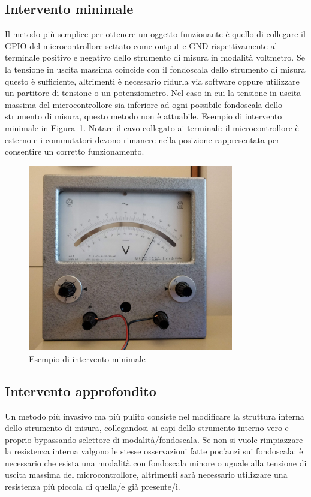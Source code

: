 \documentclass[12pt,a4paper]{report}
\begin{document}
\subsection{Intervento minimale}
Il metodo più semplice per ottenere un oggetto funzionante è quello di collegare il GPIO del microcontrollore settato come output
e GND rispettivamente al terminale positivo e negativo dello strumento di misura in modalità voltmetro. Se la tensione in uscita massima
coincide con il fondoscala dello strumento di misura questo è sufficiente, altrimenti è necessario ridurla via software oppure
utilizzare un partitore di tensione o un potenziometro. Nel caso in cui la tensione in uscita massima del microcontrollore sia inferiore
ad ogni possibile fondoscala dello strumento di misura, questo metodo non è attuabile. Esempio di intervento minimale in
Figura~\ref{fig:interventominimale}. Notare il cavo collegato ai terminali: il microcontrollore è esterno
e i commutatori devono rimanere nella posizione rappresentata per consentire un corretto funzionamento.

\begin{figure}[h]
  \centering
  \includegraphics[width=0.8\textwidth]{interventominimale}
  \caption{Esempio di intervento minimale}
  \label{fig:interventominimale}
\end{figure}

\subsection{Intervento approfondito}
Un metodo più invasivo ma più pulito consiste nel modificare la struttura interna dello strumento di misura, collegandosi ai capi dello
strumento interno vero e proprio bypassando selettore di modalità/fondoscala.
Se non si vuole rimpiazzare la resistenza interna valgono le stesse osservazioni fatte poc'anzi sui fondoscala: è necessario che
esista una modalità con fondoscala minore o uguale alla tensione di uscita massima del microcontrollore, altrimenti sarà necessario
utilizzare una resistenza più piccola di quella/e già presente/i. 
\end{document}
